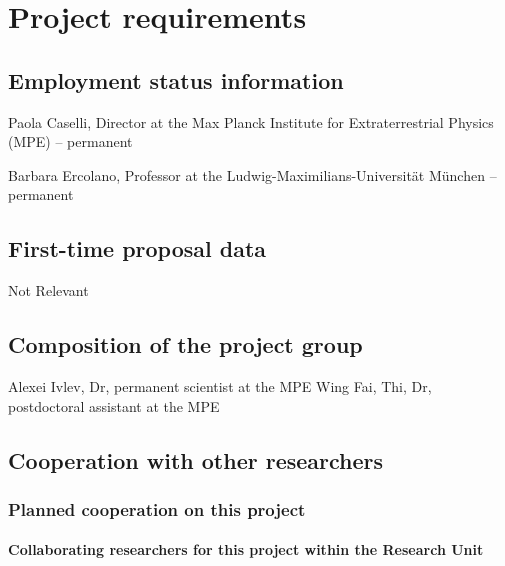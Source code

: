 \documentclass[10pt,fleqn,twoside]{article}
\begin{document}
\section{Project requirements}
\renewcommand{\leftmark}{\sc Project requirements}

\subsection{Employment status information}

Paola Caselli, Director at the Max Planck Institute for Extraterrestrial Physics (MPE) -- permanent 

Barbara Ercolano, Professor at the Ludwig-Maximilians-Universit\"at
M\"unchen -- permanent

\subsection{First-time proposal data}

Not Relevant

\subsection{Composition of the project group}

Alexei Ivlev, Dr, permanent scientist at the MPE 
Wing Fai, Thi, Dr, postdoctoral assistant at the MPE

\subsection{Cooperation with other researchers}

\subsubsection{Planned cooperation on this project}

\paragraph{Collaborating researchers for this project within the
  Research Unit}
\end{document}
